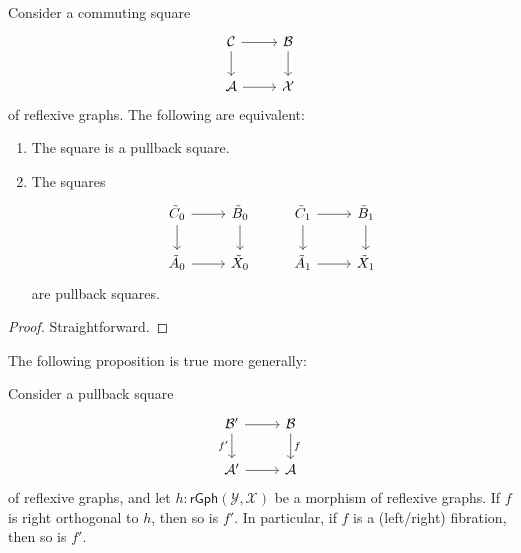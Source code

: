\begin{prp}
Consider a commuting square
\begin{equation*}
\begin{tikzcd}
\mathcal{C} \arrow[r] \arrow[d] & \mathcal{B} \arrow[d] \\
\mathcal{A} \arrow[r] & \mathcal{X}
\end{tikzcd}
\end{equation*}
of reflexive graphs. The following are equivalent:
\begin{enumerate}
\item The square is a pullback square.
\item The squares
\begin{equation*}
\begin{tikzcd}
\tilde{C}_0 \arrow[r] \arrow[d] & \tilde{B}_0 \arrow[d] & \tilde{C}_1 \arrow[r] \arrow[d] & \tilde{B}_1 \arrow[d] \\
\tilde{A}_0 \arrow[r] & \tilde{X}_0 & \tilde{A}_1 \arrow[r] & \tilde{X}_1
\end{tikzcd}
\end{equation*}
are pullback squares.
\end{enumerate}
\end{prp}

\begin{proof}
Straightforward.
\end{proof}

The following proposition is true more generally:

\begin{prp}\label{thm:fibration_pullback}
Consider a pullback square
\begin{equation*}
\begin{tikzcd}
\mathcal{B}' \arrow[r] \arrow[d,swap,"{f'}"] & \mathcal{B} \arrow[d,"f"] \\
\mathcal{A}' \arrow[r] & \mathcal{A}
\end{tikzcd}
\end{equation*}
of reflexive graphs, and let $h:\mathsf{rGph}(\mathcal{Y},\mathcal{X})$ be a morphism of reflexive graphs. If $f$ is right orthogonal to $h$, then so is $f'$. In particular, if $f$ is a (left/right) fibration, then so is $f'$. 
\end{prp}

